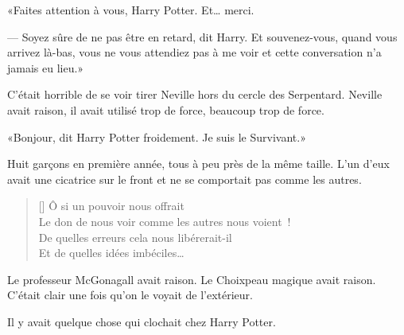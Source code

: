 «Faites attention à vous, Harry Potter. Et… merci.

--- Soyez sûre de ne pas être en retard, dit Harry. Et souvenez-vous, quand vous arrivez là-bas, vous ne vous attendiez pas à me voir et cette conversation n'a jamais eu lieu.»

\later

C'était horrible de se voir tirer Neville hors du cercle des Serpentard. Neville avait raison, il avait utilisé trop de force, beaucoup trop de force.

«Bonjour, dit Harry Potter froidement. Je suis le Survivant.»

Huit garçons en première année, tous à peu près de la même taille. L'un d'eux avait une cicatrice sur le front et ne se comportait pas comme les autres.

\baselineskip\settowidth{\versewidth}{Le don de nous voir comme les autres nous voient~!} \begin{verse}[\versewidth] Ô si un pouvoir nous offrait\\ Le don de nous voir comme les autres nous voient~!\\ De quelles erreurs cela nous libérerait-il\\ Et de quelles idées imbéciles… \end{verse}

Le professeur McGonagall avait raison. Le Choixpeau magique avait raison. C'était clair une fois qu'on le voyait de l'extérieur.

Il y avait quelque chose qui clochait chez Harry Potter.~
